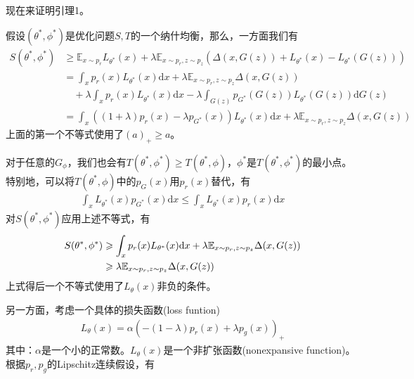             \par
            现在来证明引理1。
            \begin{Proof}
            假设$(\theta^*,\phi^*)$是优化问题$S,T$的一个纳什均衡，那么，一方面我们有
            \begin{align*}
            S(\theta^*,\phi^*) &\geqslant \mathbb{E}_{x\sim p_r} L_{\theta^*}(x)+\lambda \mathbb{E}_{x\sim p_r,z\sim p_z}(\Delta(x,G(z))+L_{\theta^*}(x) - L_{\theta^*}(G(z)))\\
            &=\int_xp_r(x)L_{\theta^*}(x)\mathrm{d}x +\lambda\mathbb{E}_{x\sim p_r,z\sim p_z}\Delta(x,G(z)) \\
            & \quad+\lambda\int_x p_r(x)L_{\theta^*}(x)\mathrm{d}x - \lambda\int_{G(z)}p_{G^*}(G(z))L_{\theta^*}(G(z))\mathrm{d} G(z)\\
            &= \int_x((1+\lambda)p_r(x) - \lambda p_{G^*}(x) )L_{\theta^*}(x)\mathrm{d}x+\lambda \mathbb{E}_{x\sim p_r,z\sim p_z}\Delta(x,G(z))
            \end{align*}
            上面的第一个不等式使用了$(a)_+ \geqslant a$。
            \par
            对于任意的$G_\phi$，我们也会有$T(\theta^*,\phi^*) \geqslant T(\theta^*,\phi)$，$\phi^*$是$T(\theta^*,\phi^*)$的最小点。特别地，可以将$T(\theta^*,\phi)$中的$p_{G}(x)$用$p_r(x)$替代，有
            \begin{align*}
            \int_x L_{\theta^*} (x)p_{G^*}(x)\mathrm{d}x \leqslant \int _x L_{\theta^*}(x)p_r(x)\mathrm{d}x
            \end{align*}
            对$S(\theta^*,\phi^*)$应用上述不等式，有
            \begin{align}
            \label{LS-GAN:eq0}
            S(\theta^*,\phi^*) &\geqslant \int_x p_r(x)L_{\theta^*}(x)\mathrm{d}x + \lambda \mathbb{E}_{x\sim p_r,z\sim p_z} \Delta(x,G(z))\notag \\
            & \geqslant \lambda \mathbb{E}_{x\sim p_r,z\sim p_z} \Delta(x,G(z))
            \end{align}
            上式得后一个不等式使用了$L_\theta(x)$非负的条件。
            \par
            另一方面，考虑一个具体的损失函数(loss funtion)
            \begin{align}
            \label{LS-GAN:eq1:具体的损失函数}
            L_\theta(x) = \alpha(-(1-\lambda)p_r(x) + \lambda p_g(x))_+
            \end{align}
            其中：$\alpha$是一个小的正常数。$L_\theta(x)$是一个非扩张函数(nonexpansive function)。根据$p_r,p_g$的Lipschitz连续假设，有

\end{Proof}

